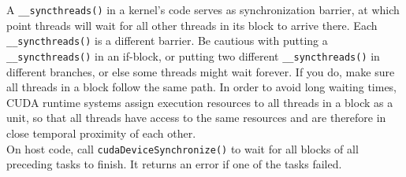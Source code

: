 \documentclass[table, xcdraw]{article}%
\begin{document}
A \texttt{__syncthreads()} in a kernel's code serves as synchronization barrier, at which point threads will wait for all other threads in its block to arrive there. Each \texttt{__syncthreads()} is a different barrier. Be cautious with putting a \texttt{__syncthreads()} in an if-block, or putting two different \texttt{__syncthreads()} in different branches, or else some threads might wait forever. If you do, make sure all threads in a block follow the same path. In order to avoid long waiting times, CUDA runtime systems assign execution resources to all threads in a block as a unit, so that all threads have access to the same resources and are therefore in close temporal proximity of each other.\\
On host code, call \texttt{cudaDeviceSynchronize()} to wait for all blocks of all preceding tasks to finish. It returns an error if one of the tasks failed.
\end{document}
